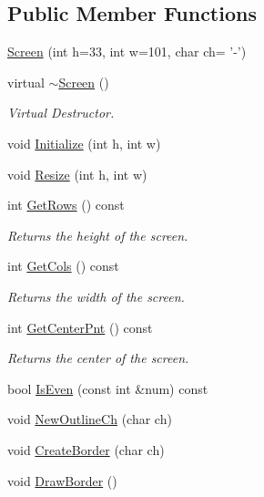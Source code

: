 \subsection*{Public Member Functions}
\begin{DoxyCompactItemize}
\item 
\hyperlink{classScreen_a932b81c3d221d644cc40ffe9003515a5}{Screen} (int h=33, int w=101, char ch= '-\/')
\item 
\hypertarget{classScreen_a0bc1a2ceaee4a245e0d31822ea0643bd}{virtual \hyperlink{classScreen_a0bc1a2ceaee4a245e0d31822ea0643bd}{$\sim$\-Screen} ()}\label{classScreen_a0bc1a2ceaee4a245e0d31822ea0643bd}

\begin{DoxyCompactList}\small\item\em Virtual Destructor. \end{DoxyCompactList}\item 
void \hyperlink{classScreen_a455b38b1ac9b18bd67ecd2e056dff909}{Initialize} (int h, int w)
\item 
void \hyperlink{classScreen_a11f9842c836301989f7c3d84eb043700}{Resize} (int h, int w)
\item 
\hypertarget{classScreen_aa12cc4ea36f5d2ac98b3c7334616acbc}{int \hyperlink{classScreen_aa12cc4ea36f5d2ac98b3c7334616acbc}{Get\-Rows} () const }\label{classScreen_aa12cc4ea36f5d2ac98b3c7334616acbc}

\begin{DoxyCompactList}\small\item\em Returns the height of the screen. \end{DoxyCompactList}\item 
\hypertarget{classScreen_a223cd8821b2b8006c61545ff41aa0091}{int \hyperlink{classScreen_a223cd8821b2b8006c61545ff41aa0091}{Get\-Cols} () const }\label{classScreen_a223cd8821b2b8006c61545ff41aa0091}

\begin{DoxyCompactList}\small\item\em Returns the width of the screen. \end{DoxyCompactList}\item 
\hypertarget{classScreen_a95daa612c5ec6a8018b89cfc2d785e27}{int \hyperlink{classScreen_a95daa612c5ec6a8018b89cfc2d785e27}{Get\-Center\-Pnt} () const }\label{classScreen_a95daa612c5ec6a8018b89cfc2d785e27}

\begin{DoxyCompactList}\small\item\em Returns the center of the screen. \end{DoxyCompactList}\item 
bool \hyperlink{classScreen_af7a18ec4e53fb371293e9ebcc23b7e2b}{Is\-Even} (const int \&num) const 
\item 
void \hyperlink{classScreen_a27dcfac6e64ab72059d0801dd9714d7a}{New\-Outline\-Ch} (char ch)
\item 
void \hyperlink{classScreen_a2ba1e54cb2fee7f246a25aed46c3ff3f}{Create\-Border} (char ch)
\item 
\hypertarget{classScreen_a146a94183c6c610ae8a619521fc9d102}{void \hyperlink{classScreen_a146a94183c6c610ae8a619521fc9d102}{Draw\-Border} ()}\label{classScreen_a146a94183c6c610ae8a619521fc9d102}


\end{DoxyCompactItemize}
